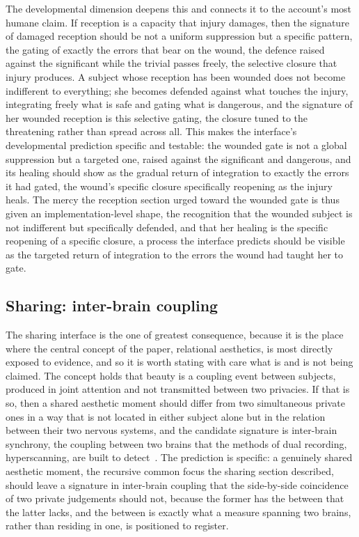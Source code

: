 The developmental dimension deepens this and connects it to the account's most humane claim. If reception is a capacity that injury damages, then the signature of damaged reception should be not a uniform suppression but a specific pattern, the gating of exactly the errors that bear on the wound, the defence raised against the significant while the trivial passes freely, the selective closure that injury produces. A subject whose reception has been wounded does not become indifferent to everything; she becomes defended against what touches the injury, integrating freely what is safe and gating what is dangerous, and the signature of her wounded reception is this selective gating, the closure tuned to the threatening rather than spread across all. This makes the interface's developmental prediction specific and testable: the wounded gate is not a global suppression but a targeted one, raised against the significant and dangerous, and its healing should show as the gradual return of integration to exactly the errors it had gated, the wound's specific closure specifically reopening as the injury heals. The mercy the reception section urged toward the wounded gate is thus given an implementation-level shape, the recognition that the wounded subject is not indifferent but specifically defended, and that her healing is the specific reopening of a specific closure, a process the interface predicts should be visible as the targeted return of integration to the errors the wound had taught her to gate.

\subsection{Sharing: inter-brain coupling}
\label{p22:sub:neuro-sharing}

The sharing interface is the one of greatest consequence, because it is the place where the central concept of the paper, relational aesthetics, is most directly exposed to evidence, and so it is worth stating with care what is and is not being claimed. The concept holds that beauty is a coupling event between subjects, produced in joint attention and not transmitted between two privacies. If that is so, then a shared aesthetic moment should differ from two simultaneous private ones in a way that is not located in either subject alone but in the relation between their two nervous systems, and the candidate signature is inter-brain synchrony, the coupling between two brains that the methods of dual recording, hyperscanning, are built to detect~\parencite{czeszumski_hyperscanning}. The prediction is specific: a genuinely shared aesthetic moment, the recursive common focus the sharing section described, should leave a signature in inter-brain coupling that the side-by-side coincidence of two private judgements should not, because the former has the between that the latter lacks, and the between is exactly what a measure spanning two brains, rather than residing in one, is positioned to register.

